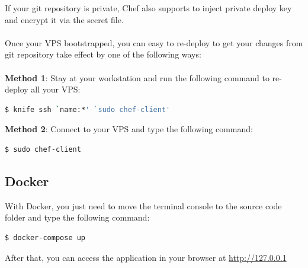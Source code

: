 \documentclass[a4paper,12pt]{article}
\begin{document}
If your git repository is private, Chef also supports to inject private deploy key and encrypt it via the secret file.
\\\\
Once your VPS bootstrapped, you can easy to re-deploy to get your changes from git repository take effect by one of the following ways:
\\
\\
\indent\textbf{Method 1}: Stay at your workstation and run the following command to re-deploy all your VPS:
\begin{lstlisting}[language=bash]
  $ knife ssh `name:*' `sudo chef-client'
\end{lstlisting}

\textbf{Method 2}: Connect to your VPS and type the following command:
\begin{lstlisting}[language=bash]
  $ sudo chef-client
\end{lstlisting}
\subsection{Docker}
With Docker, you just need to move the terminal console to the source code folder and type the following command:
\begin{lstlisting}[language=bash]
$ docker-compose up
\end{lstlisting}
After that, you can access the application in your browser at \url{http://127.0.0.1}
\end{document}
